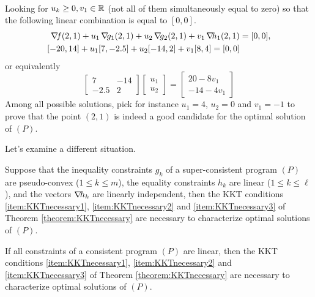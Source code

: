 \begin{example}
\begin{align*}
\end{align*}
Looking for $u_k \geq 0, v_1 \in \mathbb{R}$ (not all of them simultaneously equal to zero) so that the following linear combination is equal to $[0,0]$.
\begin{align*}
\mathop{\nabla\! {f}}(2,1) + u_1 \mathop{\nabla\! {g_1}}(2,1) + u_2 \mathop{\nabla\! {g_2}}(2,1) + v_1 \mathop{\nabla\! {h_1}}(2,1) &= [0,0], \\
[-20,14] + u_1 [7,-2.5] + u_2 [-14,2] + v_1 [8,4] = [0,0]
\end{align*}
or equivalently
\begin{equation*}
\begin{bmatrix} 7 & -14 \\ -2.5 & 2 \end{bmatrix} \begin{bmatrix} u_1 \\ u_2 \end{bmatrix} = \begin{bmatrix} 20 - 8v_1 \\ -14-4v_1 \end{bmatrix}
\end{equation*}
Among all possible solutions, pick for instance $u_1=4$, $u_2=0$ and $v_1=-1$ to prove that the point $(2,1)$ is indeed a good candidate for the optimal solution of $(P)$.
\end{example}

\separator

Let's examine a different situation.

\begin{theorem}\label{theorem:Slater}
Suppose that the inequality constraints $g_k$ of a super-consistent program $(P)$ are pseudo-convex ($1\leq k \leq m$), the equality constraints $h_k$ are linear ($1\leq k \leq \ell$), and the vectors $\mathop{\nabla\! {h_k}}$ are linearly independent, then the KKT conditions \ref{item:KKTnecessary1}, \ref{item:KKTnecessary2} and \ref{item:KKTnecessary3} of Theorem \ref{theorem:KKTnecessary} are necessary to characterize optimal solutions of $(P)$.
\end{theorem}

\begin{theorem}
If all constraints of a consistent program $(P)$ are linear, then the KKT conditions \ref{item:KKTnecessary1}, \ref{item:KKTnecessary2} and \ref{item:KKTnecessary3} of Theorem \ref{theorem:KKTnecessary} are necessary to characterize optimal solutions of $(P)$.
\end{theorem}